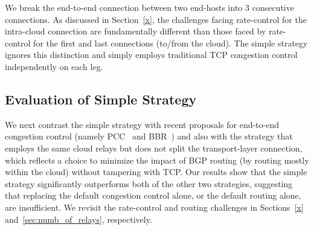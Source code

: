 \documentclass[10pt,sigconf]{acmart}
\begin{document}
\vspace{0.1in} We break the end-to-end connection between two end-hosts into $3$ consecutive connections. As discussed in Section~\ref{x}, the challenges facing rate-control for the intra-cloud connection are fundamentally different than those faced by rate-control for the first and last connections (to/from the cloud). The simple strategy ignores this distinction and simply employs traditional TCP congestion control independently on each leg.

\subsection{Evaluation of Simple Strategy}

We next contrast the simple strategy with recent proposals for end-to-end congestion control (namely PCC~\cite{PCC} and BBR~\cite{BBR}) and also with the strategy that employs the same cloud relays but does not split the transport-layer connection, which reflects a choice to minimize the impact of BGP routing (by routing mostly within the cloud) without tampering with TCP. Our results show that the simple strategy significantly outperforms both of the other two strategies, suggesting that replacing the default congestion control alone, or the default routing alone, are insufficient. We revisit the rate-control and routing challenges in Sections~\ref{x} and~\ref{sec:numb_of_relays}, respectively.
\end{document}
